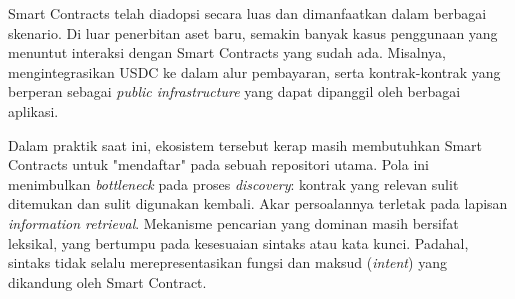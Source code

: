 




Smart Contracts telah diadopsi secara luas dan dimanfaatkan dalam berbagai skenario. Di luar penerbitan aset baru, semakin banyak kasus penggunaan yang menuntut interaksi dengan Smart Contracts yang sudah ada. Misalnya, mengintegrasikan USDC ke dalam alur pembayaran, serta kontrak-kontrak yang berperan sebagai \textit{public infrastructure} yang dapat dipanggil oleh berbagai aplikasi.

Dalam praktik saat ini, ekosistem tersebut kerap masih membutuhkan Smart Contracts untuk "mendaftar" pada sebuah repositori utama. Pola ini menimbulkan \textit{bottleneck} pada proses \textit{discovery}: kontrak yang relevan sulit ditemukan dan sulit digunakan kembali. Akar persoalannya terletak pada lapisan \textit{information retrieval}. Mekanisme pencarian yang dominan masih bersifat leksikal, yang bertumpu pada kesesuaian sintaks atau kata kunci. Padahal, sintaks tidak selalu merepresentasikan fungsi dan maksud (\textit{intent}) yang dikandung oleh Smart Contract.

